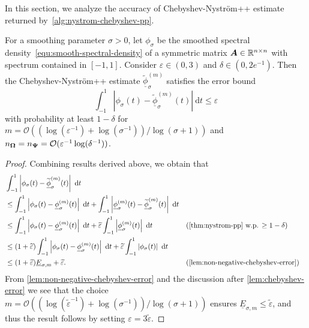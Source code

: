 In this section, we analyze the accuracy of Chebyshev-Nyström++ estimate returned by~\cref{alg:nystrom-chebyshev-pp}. 
\begin{theorem}\label{thm:chebyshev-nystrom}
    For a smoothing parameter $\sigma > 0$, let $\phi_{\sigma}$ be the smoothed spectral density~\cref{equ:smooth-spectral-density} of a symmetric matrix $\boldsymbol{A} \in \mathbb{R}^{n \times n}$ with spectrum contained in $[-1, 1]$. Consider $\varepsilon \in (0, 3)$ and $\delta \in (0, 2 e^{-1})$.
    Then the Chebyshev-Nyström++ estimate $\widetilde{\underline{\phi}}_{\sigma}^{(m)}$ 
    satisfies the error bound
    \begin{equation*}
        \int_{-1}^{1} \left| \phi_{\sigma}(t) - \widetilde{\underline{\phi}}_{\sigma}^{(m)}(t) \right|~\mathrm{d}t \leq \varepsilon
        \label{equ:chebyshev-nystrom-error}
    \end{equation*}
    with probability at least $1 - \delta$ for $m = \mathcal{O}((\log(\varepsilon^{-1}) + \log(\sigma^{-1})) / \log(\sigma + 1))$  and $n_{\boldsymbol{\Omega}} = n_{\boldsymbol{\Psi}} = \mathcal{O}(\varepsilon^{-1}\log(\delta^{-1}))$.
\end{theorem}

\begin{proof}
Combining results derived above, we obtain that 
    \begin{align*}
        &\int_{-1}^{1} \left| \phi_{\sigma}(t) - \widetilde{\underline{\phi}}_{\sigma}^{(m)}(t) \right|~\mathrm{d}t \notag \\
        &\leq \int_{-1}^{1} \left| \phi_{\sigma}(t) - \underline{\phi}_{\sigma}^{(m)}(t) \right|~\mathrm{d}t + \int_{-1}^{1} \left| \underline{\phi}_{\sigma}^{(m)}(t) - \widetilde{\underline{\phi}}_{\sigma}^{(m)}(t) \right|~\mathrm{d}t &&  \notag \\
        &\leq \int_{-1}^{1} \left| \phi_{\sigma}(t) - \underline{\phi}_{\sigma}^{(m)}(t) \right|~\mathrm{d}t + \widetilde{\varepsilon} \int_{-1}^{1} \left| \underline{\phi}_{\sigma}^{(m)}(t) \right|~\mathrm{d}t && \text{(\cref{thm:nystrom-pp} w.p. $\geq 1 - \delta$)} \notag \\
        &\leq (1 + \widetilde{\varepsilon}) \int_{-1}^{1} \left| \phi_{\sigma}(t) - \underline{\phi}_{\sigma}^{(m)}(t) \right|~\mathrm{d}t + \widetilde{\varepsilon} \int_{-1}^{1} \left| \phi_{\sigma}(t) \right|~\mathrm{d}t &&  \notag \\
        &\leq (1 + \widetilde{\varepsilon}) \underline{E}_{\sigma, m} + \widetilde{\varepsilon}. && \text{(\cref{lem:non-negative-chebyshev-error})} \notag 
    \end{align*}
    From \cref{lem:non-negative-chebyshev-error} and the discussion after \cref{lem:chebyshev-error} we see that the choice $m = \mathcal{O}((\log(\widetilde{\varepsilon}^{-1}) + \log(\sigma^{-1})) / \log(\sigma + 1))$ ensures $\underline{E}_{\sigma, m} \leq \widetilde{\varepsilon}$, and thus
    the result follows by setting $\varepsilon = 3 \widetilde{\varepsilon}$.
\end{proof}

